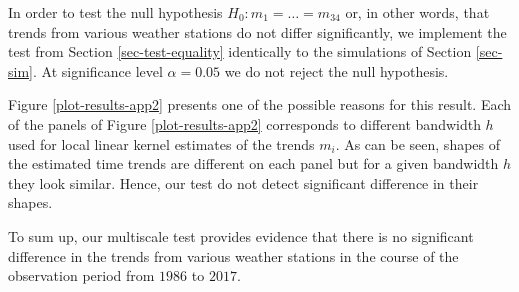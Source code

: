 In order to test the null hypothesis $H_0: m_1 = \ldots = m_{34}$ or, in other words, that trends from various weather stations do not differ significantly, we implement the test from Section \ref{sec-test-equality} identically to the simulations of Section \ref{sec-sim}. At significance level $\alpha = 0.05$ we do not reject the null hypothesis.


Figure \ref{plot-results-app2} presents one of the possible reasons for this result. Each of the panels of Figure \ref{plot-results-app2} corresponds to different bandwidth $h$ used for local linear kernel estimates of the trends $m_i$. As can be seen, shapes of the estimated time trends are different on each panel but for a given bandwidth $h$ they look similar. Hence, our test do not detect significant difference in their shapes. 



To sum up, our multiscale test provides evidence that there is no significant difference in the trends from various weather stations in the course of the observation period from $1986$ to $2017$.